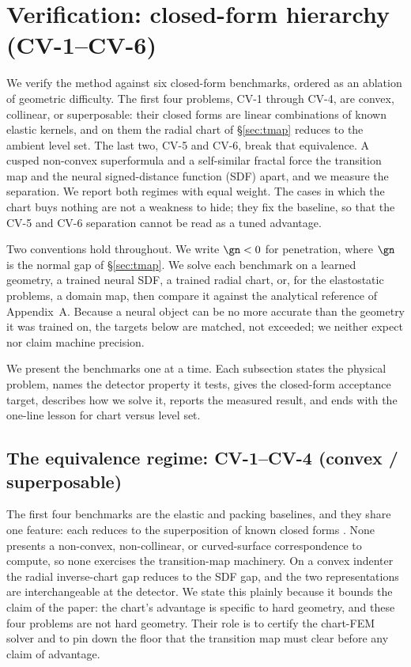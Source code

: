 \section{Verification: closed-form hierarchy (CV-1--CV-6)}\label{sec:verif}

We verify the method against six closed-form benchmarks, ordered as an ablation of geometric
difficulty. The first four problems, CV-1 through CV-4, are convex, collinear, or superposable: their
closed forms are linear combinations of known elastic kernels, and on them the radial chart of
\S\ref{sec:tmap} reduces to the ambient level set. The last two, CV-5 and CV-6, break that
equivalence. A cusped non-convex superformula and a self-similar fractal force the transition map and
the neural signed-distance function (SDF) apart, and we measure the separation. We report both regimes
with equal weight. The cases in which the chart buys nothing are not a weakness to hide; they fix the
baseline, so that the CV-5 and CV-6 separation cannot be read as a tuned advantage.

Two conventions hold throughout. We write $\gn<0$ for penetration, where $\gn$ is the normal gap of
\S\ref{sec:tmap}. We solve each benchmark on a learned geometry, a trained neural SDF, a trained
radial chart, or, for the elastostatic problems, a  domain map, then compare it
against the analytical reference of Appendix~A. Because a neural object can be no more accurate than
the geometry it was trained on, the targets below are matched, not exceeded; we neither expect nor
claim machine precision.

We present the benchmarks one at a time. Each subsection states the physical problem, names the
detector property it tests, gives the closed-form acceptance target, describes how we solve it, reports
the measured result, and ends with the one-line lesson for chart versus level set.

\subsection{The equivalence regime: CV-1--CV-4 (convex / superposable)}\label{sec:verif_equiv}

The first four benchmarks are the elastic and packing baselines, and they share one feature: each
reduces to the superposition of known closed forms \citep{johnson1985contact,timoshenko1970elasticity}.
None presents a non-convex, non-collinear, or curved-surface correspondence to compute, so none
exercises the transition-map machinery. On a convex indenter the radial inverse-chart gap reduces to
the SDF gap, and the two representations are interchangeable at the detector. We state this plainly
because it bounds the claim of the paper: the chart's advantage is specific to hard geometry, and these
four problems are not hard geometry. Their role is to certify the chart-FEM solver and to pin down the
floor that the transition map must clear before any claim of advantage.

